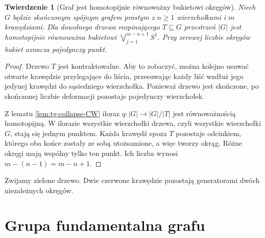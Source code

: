 \documentclass[11pt,a4paper]{report}
\numberwithin{equation}{section}
\theoremstyle{plain}
\newtheorem{twierdzenie}{Twierdzenie}[section]
\theoremstyle{definition}
\theoremstyle{remark}
\begin{document}
\begin{twierdzenie}[Graf jest homotopijnie równoważny bukietowi okręgów]
\label{thm:tg-wedge}
Niech $G$ będzie skończonym spójnym grafem prostym
z $n\ge1$ wierzchołkami i $m$ krawędziami.
Dla dowolnego drzewa rozpinającego $T\subseteq G$
przestrzeń $|G|$ jest homotopijnie równoważna bukietowi
$\bigvee_{j=1}^{m-n+1}S^1$.
Przy zerowej liczbie okręgów bukiet oznacza pojedynczy punkt.
\end{twierdzenie}

\begin{proof}
Drzewo $T$ jest kontraktowalne. Aby to zobaczyć,
można kolejno usuwać otwarte krawędzie przylegające
do liścia, przesuwając każdy liść wzdłuż jego jedynej
krawędzi do sąsiedniego wierzchołka. Ponieważ drzewo
jest skończone, po skończonej liczbie deformacji
pozostaje pojedynczy wierzchołek.

Z lematu \ref{lem:tg-collapse-CW} iloraz
$q:|G|\to|G|/|T|$ jest równoważnością homotopijną.
W ilorazie wszystkie wierzchołki drzewa, czyli wszystkie
wierzchołki $G$, stają się jednym punktem.
Każda krawędź spoza $T$ pozostaje odcinkiem, którego
oba końce zostały ze sobą utożsamione, a więc tworzy
okrąg. Różne okręgi mają wspólny tylko ten punkt.
Ich liczba wynosi $m-(n-1)=m-n+1$.
\end{proof}

\begin{center}

{\footnotesize Zwijamy zielone drzewo. Dwie czerwone krawędzie
pozostają generatorami dwóch niezależnych okręgów.}
\end{center}

\section{Grupa fundamentalna grafu}
\label{sec:tg-pi1}
\end{document}
